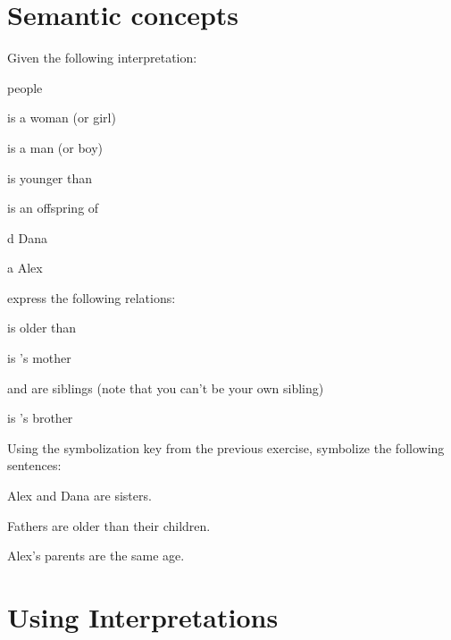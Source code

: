 \chapter{Semantic concepts}
\setcounter{ProbPart}{0}

\solutions
\problempart
Given the following interpretation:
\begin{ekey}
	\item[\text{domain}] people
	\item[\atom{W}{x}]  is a woman (or girl)
	\item[\atom{M}{x}]  is a man (or boy)
	\item[\atom{Y}{x,y}]  is younger than 
	\item[\atom{O}{x,y}]  is an offspring of 
	\item[d] Dana
	\item[a] Alex
\end{ekey}
express the following relations:
\begin{compactlist}
	\item {} is older than  \hfill{}
	\item {} is 's mother \hfill{}
	\item {} and  are siblings (note that you can't be your
	own sibling) \hfill{}
	\item {} is 's brother \hfill{}
\end{compactlist}

\problempart
Using the symbolization key from the previous
exercise, symbolize the following sentences:
\begin{compactlist}
	\item Alex and Dana are sisters. \hfill{}
	\item Fathers are older than their children.
	\hfill{}
	\item Alex's parents are the same age. \hfill{}
\end{compactlist}

\chapter{Using Interpretations}\setcounter{ProbPart}{0}

